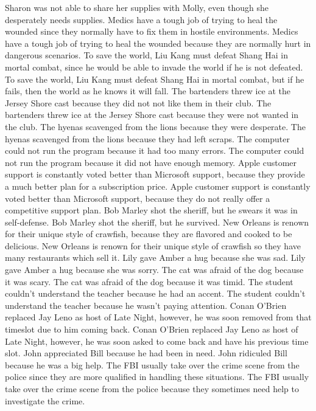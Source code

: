 \documentclass{article}
\begin{document}
\begin{enumerate}
	Sharon was not able to share her supplies with Molly, even though she desperately needs supplies.
	Medics have a tough job of trying to heal the wounded since they normally have to fix them in hostile environments.
	Medics have a tough job of trying to heal the wounded because they are normally hurt in dangerous scenarios.
	To save the world, Liu Kang must defeat Shang Hai in mortal combat, since he would be able to invade the world if he is not defeated.
	To save the world, Liu Kang must defeat Shang Hai in mortal combat, but if he fails, then the world as he knows it will fall.
	The bartenders threw ice at the Jersey Shore cast because they did not not like them in their club.
	The bartenders threw ice at the Jersey Shore cast because they were not wanted in the club.
	The hyenas scavenged from the lions because they were desperate.
	The hyenas scavenged from the lions because they had left scraps.
	The computer could not run the program because it had too many errors.
	The computer could not run the program because it did not have enough memory.
	Apple customer support is constantly voted better than Microsoft support, because they provide a much better plan for a subscription price.
	Apple customer support is constantly voted better than Microsoft support, because they do not really offer a competitive support plan.
	Bob Marley shot the sheriff, but he swears it was in self-defense.
	Bob Marley shot the sheriff, but he survived.
	New Orleans is renown for their unique style of crawfish, because they are flavored and cooked to be delicious.
	New Orleans is renown for their unique style of crawfish so they have many restaurants which sell it.
	Lily gave Amber a hug because she was sad.
	Lily gave Amber a hug because she was sorry.
	The cat was afraid of the dog because it was scary.
	The cat was afraid of the dog because it was timid.
	The student couldn't understand the teacher because he had an accent.
	The student couldn't understand the teacher because he wasn't paying attention.
	Conan O'Brien replaced Jay Leno as host of Late Night, however, he was soon removed from that timeslot due to him coming back.
	Conan O'Brien replaced Jay Leno as host of Late Night, however, he was soon asked to come back and have his previous time slot.
	John appreciated Bill because he had been in need.
	John ridiculed Bill because he was a big help.
	The FBI usually take over the crime scene from the police since they are more qualified in handling these situations.
	The FBI usually take over the crime scene from the police because they sometimes need help to investigate the crime.

\end{enumerate}
\end{document}
